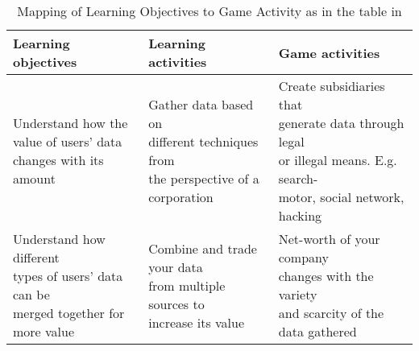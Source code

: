 \documentclass{article}
\begin{document}
\begin{table}[H]
    
    \caption{Mapping of Learning Objectives to Game Activity as in the table in} %
    \label{tab:learningobjectives2}
    \centering
    \addtolength{\leftskip}{-12cm}
    \addtolength{\rightskip}{-12cm}
    \begin{tabular}{|l|l|l|}
        \hline
        \textbf{Learning objectives}  & \textbf{Learning activities} & \textbf{Game activities}\\\hline%
        
        \makecell[l]{
        Understand how the\\
        value of users’ data\\ 
        changes with its amount} & 
        \makecell[l]{
        Gather data based on\\
        different techniques from\\
        the perspective of a \\
        corporation} & 
        \makecell[l]{
        Create subsidiaries that\\
        generate data through legal \\
        or illegal means. E.g. search-\\
        motor, social network, hacking}\\\hline
        
        \makecell[l]{
        Understand how different \\
        types of users’ data can be\\
        merged together for more value} & 
        \makecell[l]{
        Combine and trade your data\\
        from multiple sources to\\
        increase its value} & 
        \makecell[l]{
        Net-worth of your company\\
        changes with the variety \\ 
        and scarcity of the data gathered} \\\hline
    \end{tabular}
\end{table}
\end{document}
